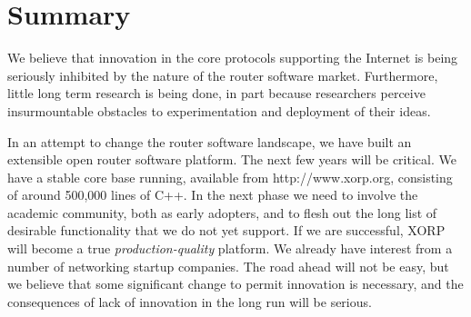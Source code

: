 
\section{Summary}




We believe that innovation in the core protocols supporting the
Internet is being seriously inhibited by the nature of the router
software market.  Furthermore, little long term research is being
done, in part because researchers perceive insurmountable obstacles to
experimentation and deployment of their ideas.

In an attempt to change the router software landscape, we have built
an extensible open router software platform.  The next few years will
be critical.  We have a stable core base running, available from
{\sf\small http://www.xorp.org}, consisting of
around 500,000 lines of C++.  In the next phase we need to involve the
academic community, both as early adopters, and to flesh out the long
list of desirable functionality that we do not yet support.  If we are
successful, XORP will become a true {\it production-quality} platform.
We already have interest from a number of networking startup
companies.  The road ahead will not be easy, but we believe that some
significant change to permit innovation is necessary, and the
consequences of lack of innovation in the long run will be serious.


